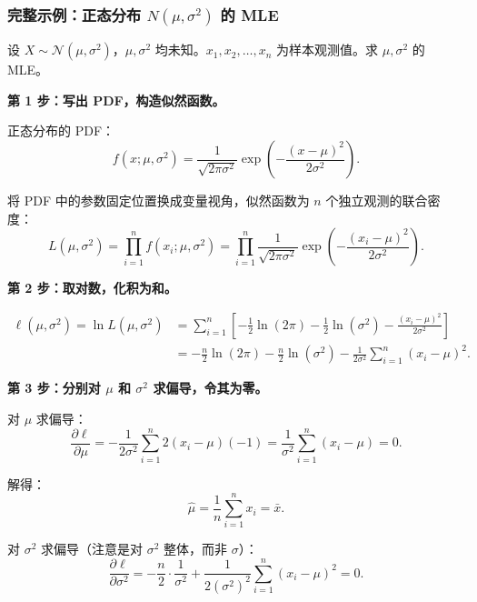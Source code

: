 \subsubsection{完整示例：正态分布 $N(\mu, \sigma^2)$ 的 MLE}

设 $X \sim \mathcal{N}(\mu, \sigma^2)$，$\mu, \sigma^2$ 均未知。$x_1, x_2, \dots, x_n$ 为样本观测值。求 $\mu, \sigma^2$ 的 MLE。

\medskip
\textbf{第 1 步：写出 PDF，构造似然函数。}

正态分布的 PDF：
\begin{equation}
    f(x; \mu, \sigma^2) = \frac{1}{\sqrt{2\pi\sigma^2}} \exp\!\left(-\frac{(x - \mu)^2}{2\sigma^2}\right).
\end{equation}

将 PDF 中的参数固定位置换成变量视角，似然函数为 $n$ 个独立观测的联合密度：
\begin{equation}
    L(\mu, \sigma^2) = \prod_{i=1}^{n} f(x_i; \mu, \sigma^2)
    = \prod_{i=1}^{n} \frac{1}{\sqrt{2\pi\sigma^2}} \exp\!\left(-\frac{(x_i - \mu)^2}{2\sigma^2}\right).
\end{equation}

\medskip
\textbf{第 2 步：取对数，化积为和。}

\begin{align}
    \ell(\mu, \sigma^2) = \ln L(\mu, \sigma^2)
    &= \sum_{i=1}^{n} \left[ -\frac{1}{2}\ln(2\pi) - \frac{1}{2}\ln(\sigma^2) - \frac{(x_i - \mu)^2}{2\sigma^2} \right] \\
    &= -\frac{n}{2}\ln(2\pi) - \frac{n}{2}\ln(\sigma^2) - \frac{1}{2\sigma^2}\sum_{i=1}^{n}(x_i - \mu)^2.
\end{align}

\medskip
\textbf{第 3 步：分别对 $\mu$ 和 $\sigma^2$ 求偏导，令其为零。}

对 $\mu$ 求偏导：
\begin{equation}
    \frac{\partial \ell}{\partial \mu}
    = -\frac{1}{2\sigma^2} \sum_{i=1}^{n} 2(x_i - \mu)(-1)
    = \frac{1}{\sigma^2} \sum_{i=1}^{n} (x_i - \mu) = 0.
\end{equation}

解得：
\begin{equation}
    \boxed{\hat{\mu} = \frac{1}{n}\sum_{i=1}^{n} x_i = \bar{x}}.
\end{equation}

对 $\sigma^2$ 求偏导（注意是对 $\sigma^2$ 整体，而非 $\sigma$）：
\begin{equation}
    \frac{\partial \ell}{\partial \sigma^2}
    = -\frac{n}{2} \cdot \frac{1}{\sigma^2} + \frac{1}{2(\sigma^2)^2} \sum_{i=1}^{n}(x_i - \mu)^2 = 0.
\end{equation}

